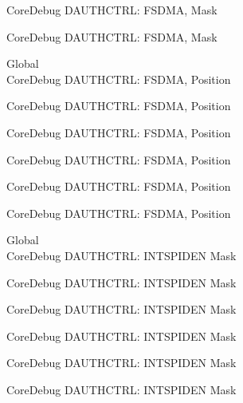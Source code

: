 \begin{DoxyRefList}
\label{deprecated__deprecated001213}%
%
Core\+Debug DAUTHCTRL\+: FSDMA, Mask 

\label{deprecated__deprecated001315}%
%
Core\+Debug DAUTHCTRL\+: FSDMA, Mask  
\item[Global \doxylink{group___c_m_s_i_s___s_c_b_ga2b4fde73cbbbb0adeb686dc20ff705de}{Core\+Debug\+\_\+\+DAUTHCTRL\+\_\+\+FSDMA\+\_\+\+Pos} ]\hfill \\
\label{deprecated__deprecated000083}%
%
Core\+Debug DAUTHCTRL\+: FSDMA, Position 

\label{deprecated__deprecated000534}%
%
Core\+Debug DAUTHCTRL\+: FSDMA, Position 

\label{deprecated__deprecated000636}%
%
Core\+Debug DAUTHCTRL\+: FSDMA, Position 

\label{deprecated__deprecated000761}%
%
Core\+Debug DAUTHCTRL\+: FSDMA, Position 

\label{deprecated__deprecated001212}%
%
Core\+Debug DAUTHCTRL\+: FSDMA, Position 

\label{deprecated__deprecated001314}%
%
Core\+Debug DAUTHCTRL\+: FSDMA, Position  
\item[Global \doxylink{group___c_m_s_i_s___s_c_b_ga1570f149a0f89f70fc2644a5842cbcb4}{Core\+Debug\+\_\+\+DAUTHCTRL\+\_\+\+INTSPIDEN\+\_\+\+Msk} ]\hfill \\
\label{deprecated__deprecated000090}%
%
Core\+Debug DAUTHCTRL\+: INTSPIDEN Mask 

\label{deprecated__deprecated000144}%
%
Core\+Debug DAUTHCTRL\+: INTSPIDEN Mask 

\label{deprecated__deprecated000220}%
%
Core\+Debug DAUTHCTRL\+: INTSPIDEN Mask 

\label{deprecated__deprecated000283}%
%
Core\+Debug DAUTHCTRL\+: INTSPIDEN Mask 

\label{deprecated__deprecated000362}%
%
Core\+Debug DAUTHCTRL\+: INTSPIDEN Mask 

\label{deprecated__deprecated000438}%
%
Core\+Debug DAUTHCTRL\+: INTSPIDEN Mask 


\end{DoxyRefList}
